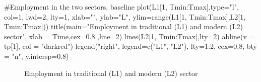 \documentclass[
  letterpaper,
  DIV=11,
  numbers=noendperiod]{scrreprt}
\newenvironment{Shaded}{\begin{snugshade}}{\end{snugshade}}
\newcommand{\AttributeTok}[1]{\textcolor[rgb]{0.40,0.45,0.13}{#1}}
\newcommand{\CommentTok}[1]{\textcolor[rgb]{0.37,0.37,0.37}{#1}}
\newcommand{\DecValTok}[1]{\textcolor[rgb]{0.68,0.00,0.00}{#1}}
\newcommand{\FloatTok}[1]{\textcolor[rgb]{0.68,0.00,0.00}{#1}}
\newcommand{\FunctionTok}[1]{\textcolor[rgb]{0.28,0.35,0.67}{#1}}
\newcommand{\NormalTok}[1]{\textcolor[rgb]{0.00,0.23,0.31}{#1}}
\newcommand{\SpecialCharTok}[1]{\textcolor[rgb]{0.37,0.37,0.37}{#1}}
\newcommand{\StringTok}[1]{\textcolor[rgb]{0.13,0.47,0.30}{#1}}
\begin{document}
\begin{Shaded}
\begin{Highlighting}[]
\CommentTok{\#Employment in the two sectors, baseline}
\FunctionTok{plot}\NormalTok{(L1[}\DecValTok{1}\NormalTok{, Tmin}\SpecialCharTok{:}\NormalTok{Tmax],}\AttributeTok{type=}\StringTok{"l"}\NormalTok{, }\AttributeTok{col=}\DecValTok{1}\NormalTok{, }\AttributeTok{lwd=}\DecValTok{2}\NormalTok{, }\AttributeTok{lty=}\DecValTok{1}\NormalTok{, }\AttributeTok{xlab=}\StringTok{""}\NormalTok{, }\AttributeTok{ylab=}\StringTok{"L"}\NormalTok{, }\AttributeTok{ylim=}\FunctionTok{range}\NormalTok{(L1[}\DecValTok{1}\NormalTok{, Tmin}\SpecialCharTok{:}\NormalTok{Tmax],L2[}\DecValTok{1}\NormalTok{, Tmin}\SpecialCharTok{:}\NormalTok{Tmax])) }
\FunctionTok{title}\NormalTok{(}\AttributeTok{main=}\StringTok{"Employment in traditional (L1) and modern (L2) sector"}\NormalTok{, }\AttributeTok{xlab =} \StringTok{\textquotesingle{}Time\textquotesingle{}}\NormalTok{,}\AttributeTok{cex=}\FloatTok{0.8}\NormalTok{ ,}\AttributeTok{line=}\DecValTok{2}\NormalTok{)}
\FunctionTok{lines}\NormalTok{(L2[}\DecValTok{1}\NormalTok{, Tmin}\SpecialCharTok{:}\NormalTok{Tmax],}\AttributeTok{lty=}\DecValTok{2}\NormalTok{)}
\FunctionTok{abline}\NormalTok{(}\AttributeTok{v =}\NormalTok{ tp[}\DecValTok{1}\NormalTok{], }\AttributeTok{col =} \StringTok{"darkred"}\NormalTok{)}
\FunctionTok{legend}\NormalTok{(}\StringTok{"right"}\NormalTok{, }\AttributeTok{legend=}\FunctionTok{c}\NormalTok{(}\StringTok{"L1"}\NormalTok{, }\StringTok{"L2"}\NormalTok{),}
       \AttributeTok{lty=}\DecValTok{1}\SpecialCharTok{:}\DecValTok{2}\NormalTok{, }\AttributeTok{cex=}\FloatTok{0.8}\NormalTok{, }\AttributeTok{bty =} \StringTok{"n"}\NormalTok{, }\AttributeTok{y.intersp=}\FloatTok{0.8}\NormalTok{)}
\end{Highlighting}
\end{Shaded}

\begin{figure}[H]


\caption{\label{fig-employment}Employment in traditional (L1) and modern
(L2) sector}

\end{figure}%
\end{document}
